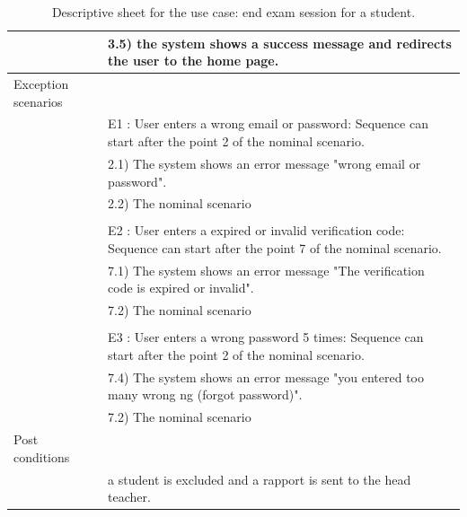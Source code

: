 \documentclass[]{uc2pfecaneva}
\begin{document}
\begin{table}[h]
\begin{tabularx}{\textwidth}{|l|X|}
		                      & \hspace{4mm}3.5) the system shows a success message and redirects the user to the home page.                           \\ \hline
		Exception scenarios   &                                                                                                                        \\
		                      & E1 : User enters a wrong email or password: Sequence can start after the point 2 of the nominal scenario.              \\
		                      & \hspace{4mm}2.1) The system shows an error message "wrong email or password".                                          \\
		                      & \hspace{4mm}2.2) The nominal scenario                                                                                  \\
		                      &                                                                                                                        \\
		                      & E2 : User enters a expired or invalid verification code: Sequence can start after the point 7 of the nominal scenario. \\
		                      & \hspace{4mm}7.1) The system shows an error message "The verification code is expired or invalid".                      \\
		                      & \hspace{4mm}7.2) The nominal scenario                                                                                  \\
		                      &                                                                                                                        \\
		                      & E3 : User enters a wrong password 5 times: Sequence can start after the point 2 of the nominal scenario.               \\
		                      & \hspace{4mm}7.4) The system shows an error message "you entered too many wrong ng (forgot password)".                  \\
		                      & \hspace{4mm}7.2) The nominal scenario                                                                                  \\ \hline
		Post conditions       &                                                                                                                        \\
		                      & a student is excluded and a rapport is sent to the head teacher.                                                       \\ \hline
	\end{tabularx}
	\caption{Descriptive sheet for the use case: end exam session for a student.}
	\label{table:5}
\end{table}
\end{document}
